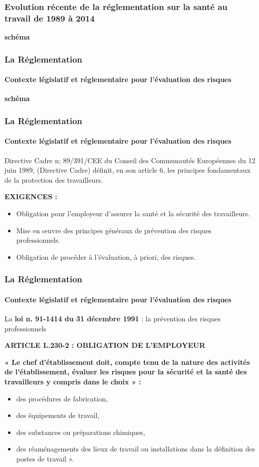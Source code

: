 \documentclass{beamer}
\begin{document}
\begin{frame}
\frametitle{Evolution récente de la réglementation sur la santé au travail de 1989 à 2014}

\textbf{schéma}

\end{frame}


\begin{frame}
\frametitle{La Réglementation}
\framesubtitle{Contexte législatif et réglementaire pour l’évaluation des risques}
\textbf{schéma}

\end{frame}

\begin{frame}
\frametitle{La Réglementation}
\framesubtitle{Contexte législatif et réglementaire pour l’évaluation des risques}

Directive Cadre n; 89/391/CEE du Conseil des Communautés Européennes du 12 juin 1989, (Directive Cadre) définit, en son article 6, les principes fondamentaux de la protection des travailleurs.


\textbf{EXIGENCES :}
\begin{itemize}
\item Obligation pour l’employeur d’assurer la santé et la sécurité des travailleurs.

\item Mise en œuvre des principes généraux de prévention des risques professionnels.

\item Obligation de procéder à l’évaluation, à priori, des risques.
\end{itemize}
\end{frame}

\begin{frame}
\frametitle{La Réglementation}
\framesubtitle{Contexte législatif et réglementaire pour l’évaluation des risques}

La \textbf{loi n. 91-1414  du 31 décembre 1991} : la prévention des risques professionnels

\textbf{ARTICLE L.230-2 : OBLIGATION DE L’EMPLOYEUR}

\textbf{« Le chef d’établissement doit, compte tenu de la nature des activités de l’établissement, évaluer les risques pour la sécurité et la santé des travailleurs y compris dans le choix » :}
\begin{itemize}
    \item des procédures de fabrication,
	\item des équipements de travail,
	\item des substances ou préparations chimiques,
	\item des réaménagements des lieux de travail ou installations dans la définition des postes de travail ».
\end{itemize}
\end{frame}
\end{document}
